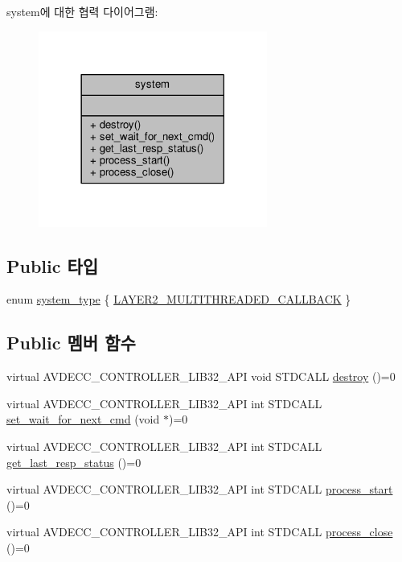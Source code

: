 system에 대한 협력 다이어그램\+:
\nopagebreak
\begin{figure}[H]
\begin{center}
\leavevmode
\includegraphics[width=213pt]{classavdecc__lib_1_1system__coll__graph}
\end{center}
\end{figure}
\subsection*{Public 타입}
\begin{DoxyCompactItemize}
\item 
enum \hyperlink{classavdecc__lib_1_1system_aacdda6e9ef910c6762dd50aefd8ee5bb}{system\+\_\+type} \{ \hyperlink{classavdecc__lib_1_1system_aacdda6e9ef910c6762dd50aefd8ee5bba88df7608630d8183aa6d68acffce3680}{L\+A\+Y\+E\+R2\+\_\+\+M\+U\+L\+T\+I\+T\+H\+R\+E\+A\+D\+E\+D\+\_\+\+C\+A\+L\+L\+B\+A\+CK}
 \}
\end{DoxyCompactItemize}
\subsection*{Public 멤버 함수}
\begin{DoxyCompactItemize}
\item 
virtual A\+V\+D\+E\+C\+C\+\_\+\+C\+O\+N\+T\+R\+O\+L\+L\+E\+R\+\_\+\+L\+I\+B32\+\_\+\+A\+PI void S\+T\+D\+C\+A\+LL \hyperlink{classavdecc__lib_1_1system_a3fb39895d6d015a25c95b846a3f9bdc0}{destroy} ()=0
\item 
virtual A\+V\+D\+E\+C\+C\+\_\+\+C\+O\+N\+T\+R\+O\+L\+L\+E\+R\+\_\+\+L\+I\+B32\+\_\+\+A\+PI int S\+T\+D\+C\+A\+LL \hyperlink{classavdecc__lib_1_1system_a26b769584f10225077da47583edda33e}{set\+\_\+wait\+\_\+for\+\_\+next\+\_\+cmd} (void $\ast$)=0
\item 
virtual A\+V\+D\+E\+C\+C\+\_\+\+C\+O\+N\+T\+R\+O\+L\+L\+E\+R\+\_\+\+L\+I\+B32\+\_\+\+A\+PI int S\+T\+D\+C\+A\+LL \hyperlink{classavdecc__lib_1_1system_aa63e8d1a4e51f695cdcccc9340922407}{get\+\_\+last\+\_\+resp\+\_\+status} ()=0
\item 
virtual A\+V\+D\+E\+C\+C\+\_\+\+C\+O\+N\+T\+R\+O\+L\+L\+E\+R\+\_\+\+L\+I\+B32\+\_\+\+A\+PI int S\+T\+D\+C\+A\+LL \hyperlink{classavdecc__lib_1_1system_aaee7f0a66bb2f7e45ee95a206caa4531}{process\+\_\+start} ()=0
\item 
virtual A\+V\+D\+E\+C\+C\+\_\+\+C\+O\+N\+T\+R\+O\+L\+L\+E\+R\+\_\+\+L\+I\+B32\+\_\+\+A\+PI int S\+T\+D\+C\+A\+LL \hyperlink{classavdecc__lib_1_1system_a1065ec20ef44ca9d8d66d81bb369a28f}{process\+\_\+close} ()=0
\end{DoxyCompactItemize}


